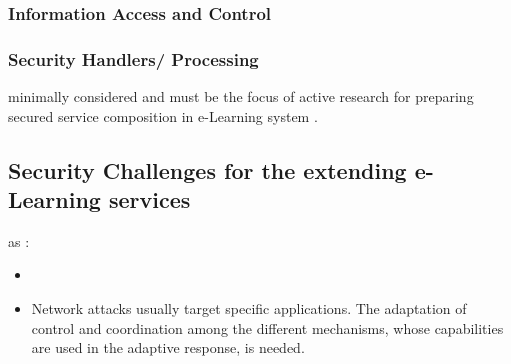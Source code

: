 \subsubsection{Information Access and Control}  \blindtext
 \subsubsection{ Security Handlers/ Processing} \blindtext
minimally considered and must be the focus of active research for preparing secured
service composition in e-Learning system \cite{car}.

\subsection{Security Challenges for the extending e-Learning services}
 \blindtext  as \cite{car}:
\begin{itemize}
 \item  \blindtext
 \item Network attacks usually target specific applications. The adaptation of control and coordination among the different mechanisms, whose capabilities are used
in the adaptive response, is needed.
\end{itemize}
 \blindtext
